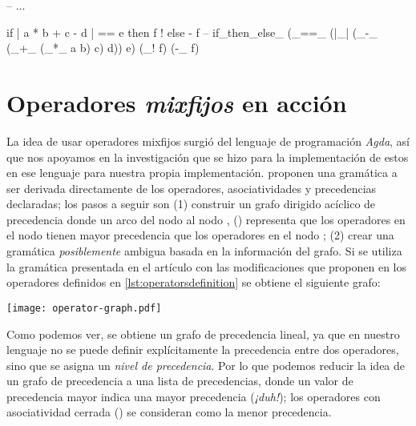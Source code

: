 {\begin{designfr}
\begin{anglercode}[label=lst:operatorsdefinition]
-- ...

if | a * b + c - d | == e then f ! else - f
-- if_then_else_ (_==_ (|_| (_-_ (_+_ (_*_ a b) c) d)) e) (_! f) (-_ f)
\end{anglercode}
\end{designfr}

\section{Operadores \emph{mixfijos} en acción}

\begin{investigationfr}
La idea de usar operadores mixfijos surgió del lenguaje de programación \emph{Agda}, así que nos apoyamos en la investigación que se hizo para la implementación de estos en ese lenguaje para nuestra propia implementación. \cite{article:mixfix} proponen una gramática a ser derivada directamente de los operadores, asociatividades y precedencias declaradas; los pasos a seguir son (1) construir un grafo dirigido acíclico de precedencia donde un arco del nodo  al nodo , () representa que los operadores en el nodo  tienen mayor precedencia que los operadores en el nodo ; (2) crear una gramática \emph{posiblemente} ambigua basada en la información del grafo. Si se utiliza la gramática presentada en el artículo con las modificaciones que proponen en los operadores definidos en \ref{lst:operatorsdefinition} se obtiene el siguiente grafo:

\begin{center}
\texttt{[image: operator-graph.pdf]}
\label{fig:operator-graph}
\end{center}

Como podemos ver, se obtiene un grafo de precedencia lineal, ya que en nuestro lenguaje no se puede definir explícitamente la precedencia entre dos operadores, sino que se asigna un \emph{nivel de precedencia}. Por lo que podemos reducir la idea de un grafo de precedencia a una lista de precedencias, donde un valor de precedencia mayor indica una mayor precedencia (\emph{¡duh!}); los operadores con asociatividad cerrada () se consideran como la menor precedencia.

{   %
\newcommand{\overp}[1]{\overset{#1}{p}}
\renewcommand{\_}{\:\:}

}
\end{investigationfr}}
